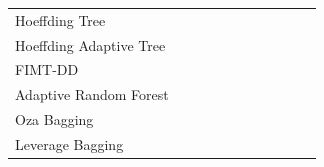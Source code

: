 \documentclass[twoside,11pt]{article}
\newcommand{\cmark}{\ding{51}}  %
\begin{document}
\begin{table}[!b]
\begin{threeparttable}[t]
\begin{tabular}{@{}lccccc|ccccc@{}}
    Hoeffding Tree          & \cmark                                  &                                     & \cmark                                 &                                       &                                          & \cmark                        &                                                 &                                                    & \cmark                                     & \cite{Domingos2000}  \\
    Hoeffding Adaptive Tree & \cmark                                  &                                     & \cmark                                 &                                       & \cmark                                   & \cmark                        &                                                 &                                                    & \cmark                                     & \cite{Bifet-et-al-2018}  \\
    FIMT-DD                 &                                         & \cmark                              & \cmark                                 &                                       & \cmark                                   & \cmark                        &                                                 &                                                    & \cmark                                     & \cite{Bifet-et-al-2018}  \\
    Adaptive Random Forest  & \cmark                                  &                                     & \cmark                                 &                                       & \cmark                                   & \cmark                        &                                                 &                                                    & \cmark                                     & \cite{Gomes2017}  \\
    Oza Bagging             & \cmark                                  &                                     & \cmark                                 &                                       & \tnote{*}                                & \cmark                        &                                                 &                                                    & \cmark                                     & \cite{Oza2005}  \\
    Leverage Bagging        & \cmark                                  &                                     & \cmark                                 &                                       & \cmark                                   & \cmark                        &                                                 &                                                    & \cmark                                     & \cite{Bifet-et-al-2018} \\

\end{tabular}
\end{threeparttable}
\end{table}
\end{document}
